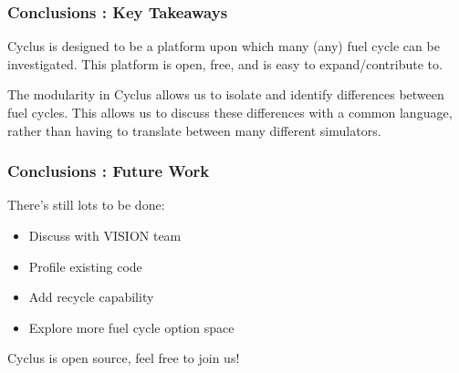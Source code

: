 
\begin{frame}
  \frametitle{Conclusions : Key Takeaways}
  Cyclus is designed to be a platform upon which many (any) fuel 
  cycle can be investigated. This platform is open, free, and is easy
  to expand/contribute to.

  \vspace{0.2cm}

  The modularity in Cyclus allows us to isolate and identify 
  differences between fuel cycles. This allows us to discuss these 
  differences with a common language, rather than having to translate
  between many different simulators.
\end{frame}

\begin{frame}
  \frametitle{Conclusions : Future Work}
  There's still lots to be done:
  \begin{itemize}
    \item Discuss with VISION team
    \item Profile existing code
    \item Add recycle capability
    \item Explore more fuel cycle option space
  \end{itemize}
  Cyclus is open source, feel free to join us!
\end{frame}
